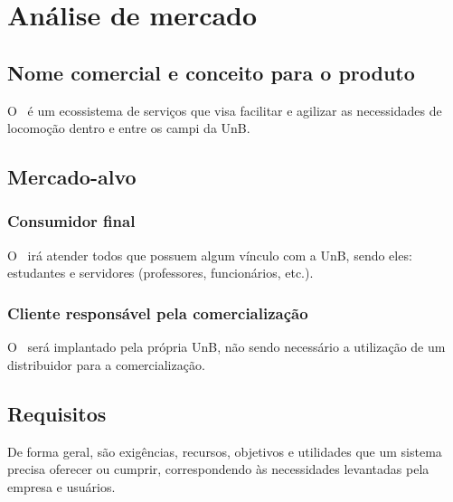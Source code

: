 \chapter{Análise de mercado}

\section{Nome comercial e conceito para o produto}

O \nomeproduto\ é um ecossistema de serviços que visa facilitar e agilizar as necessidades de locomoção dentro e entre os campi da UnB.


\section{Mercado-alvo}

\subsection{Consumidor final}

O \nomeproduto\ irá atender todos que possuem algum vínculo com a UnB, sendo eles: estudantes e servidores (professores, funcionários, etc.).


\subsection{Cliente responsável pela comercialização}

O \nomeproduto\ será implantado pela própria UnB, não sendo necessário a utilização de um distribuidor para a comercialização.


\section{Requisitos}

De forma geral, são exigências, recursos, objetivos e utilidades que um sistema precisa oferecer ou cumprir, correspondendo às necessidades levantadas pela empresa e usuários.

